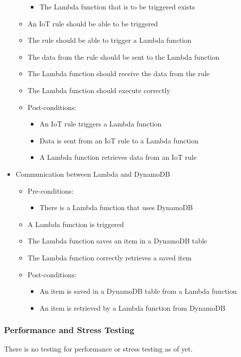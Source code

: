 \documentclass{article}
\begin{document}
\begin{itemize}
\begin{itemize}
\begin{itemize}
						\item The Lambda function that is to be triggered exists
					\end{itemize}
					\item An IoT rule should be able to be triggered
					\item The rule should be able to trigger a Lambda function
					\item The data from the rule should be sent to the Lambda function 
					\item The Lambda function should receive the data from the rule
					\item The Lambda function should execute correctly
					\item Post-conditions:
					\begin{itemize}
						\item An IoT rule triggers a Lambda function
						\item Data is sent from an IoT rule to a Lambda function
						\item A Lambda function retrieves data from an IoT rule
					\end{itemize}
				\end{itemize}
				
				\item{Communication between Lambda and DynamoDB}
				\begin{itemize}
					\item Pre-conditions: 
					\begin{itemize}
						\item There is a Lambda function that uses DynamoDB
					\end{itemize}
					\item A Lambda function is triggered
					\item The Lambda function saves an item in a DynamoDB table
					\item The Lambda function correctly retrieves a saved item
					\item Post-conditions:
					\begin{itemize}
						\item An item is saved in a DynamoDB table from a Lambda function
						\item An item is retrieved by a Lambda function from DynamoDB
					\end{itemize}
				\end{itemize}
			\end{itemize}
			
			\subsubsection{Performance and Stress Testing}
			There is no testing for performance or stress testing as of yet.
\newpage
\end{document}
